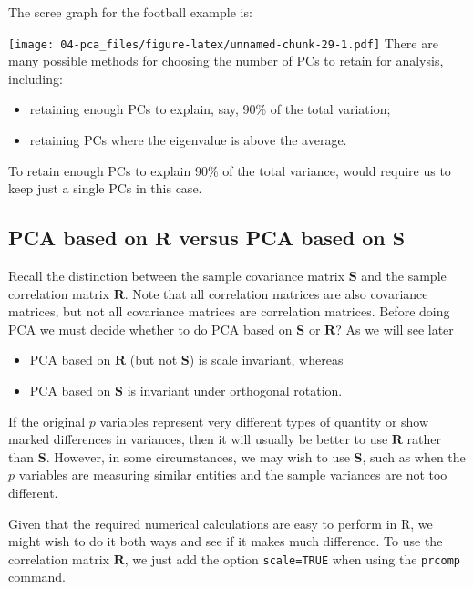 \documentclass[]{book}
\providecommand{\tightlist}{%
  \setlength{\itemsep}{0pt}\setlength{\parskip}{0pt}}
\theoremstyle{definition}
\theoremstyle{definition}
\theoremstyle{definition}
\theoremstyle{remark}
\begin{document}
The scree graph for the football example is:

\texttt{[image: 04-pca\_files/figure-latex/unnamed-chunk-29-1.pdf]}
There are many possible methods for choosing the number of PCs to retain for analysis, including:

\begin{itemize}
\tightlist
\item
  retaining enough PCs to explain, say, 90\% of the total variation;
\item
  retaining PCs where the eigenvalue is above the average.
\end{itemize}

To retain enough PCs to explain 90\% of the total variance, would require us to keep just a single PCs in this case.

\hypertarget{pcawithR}{%
\subsection{\texorpdfstring{PCA based on \(\boldsymbol R\) versus PCA based on \(\boldsymbol S\)}{PCA based on \textbackslash{}boldsymbol R versus PCA based on \textbackslash{}boldsymbol S}}\label{pcawithR}}

Recall the distinction between the sample covariance matrix \(\boldsymbol S\) and the sample correlation matrix \(\boldsymbol R\).
Note that all correlation matrices are also covariance matrices, but not all covariance matrices are correlation matrices.
Before doing PCA we must decide whether to do PCA based on \(\boldsymbol S\) or \(\boldsymbol R\)? As we will see later

\begin{itemize}
\tightlist
\item
  PCA based on \(\boldsymbol R\) (but not \(\boldsymbol S\)) is scale invariant, whereas
\item
  PCA based on \(\boldsymbol S\) is invariant under orthogonal rotation.
\end{itemize}

If the original \(p\) variables represent very different types of quantity or show marked differences in variances, then it will usually be better to use \(\boldsymbol R\) rather than \(\boldsymbol S\). However, in some circumstances, we may wish to use \(\boldsymbol S\), such as when the \(p\) variables are measuring similar entities and the sample variances are not too different.

Given that the required numerical calculations are easy to perform in R, we might wish to do it both ways and see if it makes much difference. To use the correlation matrix \(\boldsymbol R\), we just add the option \texttt{scale=TRUE} when using the \texttt{prcomp} command.
\end{document}
